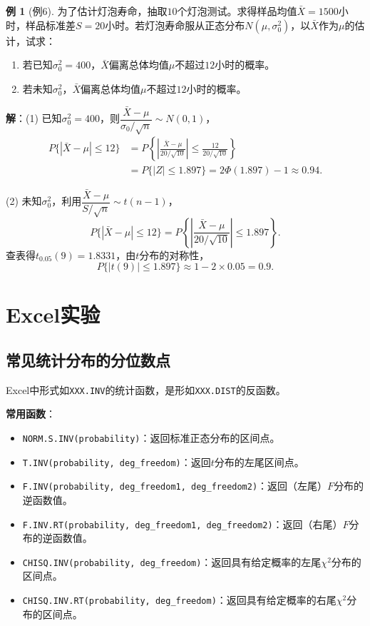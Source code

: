 \documentclass[11pt,a4paper]{report}
\theoremstyle{definition}
\newtheorem{example}{例}[chapter]
\theoremstyle{plain}
\begin{document}
\begin{example}[例6]
为了估计灯泡寿命，抽取$10$个灯泡测试。求得样品均值$\bar{X}=1500$小时，样品标准差$S=20$小时。若灯泡寿命服从正态分布$N(\mu,\sigma_0^2)$，以$\bar{X}$作为$\mu$的估计，试求：
\begin{enumerate}[label=(\arabic*),leftmargin=2em]
    \item 若已知$\sigma_0^2=400$，$\bar{X}$偏离总体均值$\mu$不超过$12$小时的概率。
    \item 若未知$\sigma_0^2$，$\bar{X}$偏离总体均值$\mu$不超过$12$小时的概率。
\end{enumerate}

\textbf{解}：(1) 已知$\sigma_0^2=400$，则$\dfrac{\bar{X}-\mu}{\sigma_0/\sqrt{n}}\sim N(0,1)$，
\[
\begin{aligned}
P\{|\bar{X}-\mu|\leq 12\}
&=P\left\{\left|\frac{\bar{X}-\mu}{20/\sqrt{10}}\right|\leq\frac{12}{20/\sqrt{10}}\right\}\\
&=P\{|Z|\leq 1.897\}=2\Phi(1.897)-1\approx 0.94.
\end{aligned}
\]

(2) 未知$\sigma_0^2$，利用$\dfrac{\bar{X}-\mu}{S/\sqrt{n}}\sim t(n-1)$，
\[
P\{|\bar{X}-\mu|\leq 12\}
=P\left\{\left|\frac{\bar{X}-\mu}{20/\sqrt{10}}\right|\leq 1.897\right\}.
\]
查表得$t_{0.05}(9)=1.8331$，由$t$分布的对称性，
\[
P\{|t(9)|\leq 1.897\}\approx 1-2\times 0.05=0.9.
\]
\end{example}

\section{Excel实验}

\subsection{常见统计分布的分位数点}

Excel中形式如\texttt{XXX.INV}的统计函数，是形如\texttt{XXX.DIST}的反函数。

\textbf{常用函数}：
\begin{itemize}[leftmargin=2em]
    \item \texttt{NORM.S.INV(probability)}：返回标准正态分布的区间点。
    \item \texttt{T.INV(probability, deg\_freedom)}：返回$t$分布的左尾区间点。
    \item \texttt{F.INV(probability, deg\_freedom1, deg\_freedom2)}：返回（左尾）$F$分布的逆函数值。
    \item \texttt{F.INV.RT(probability, deg\_freedom1, deg\_freedom2)}：返回（右尾）$F$分布的逆函数值。
    \item \texttt{CHISQ.INV(probability, deg\_freedom)}：返回具有给定概率的左尾$\chi^2$分布的区间点。
    \item \texttt{CHISQ.INV.RT(probability, deg\_freedom)}：返回具有给定概率的右尾$\chi^2$分布的区间点。
\end{itemize}
\end{document}

